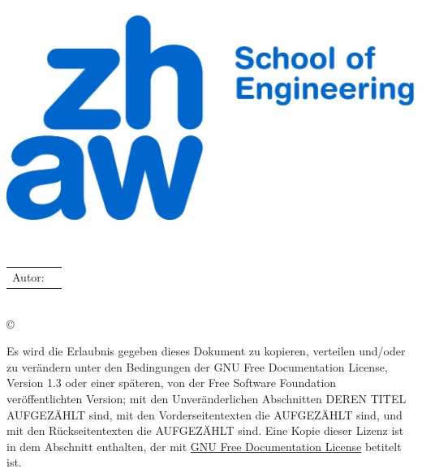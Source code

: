 \begin{titlepage}

\begin{center}
\includegraphics[scale=0.25]{pic/ZHAW_Titel}			%
\\[12ex]
\huge{\textbf{\textsc{\titel}}}							%
\\[1.5ex]
\LARGE{\textbf{\untertitel}}							%
\\[6ex]
\normalsize												%

\begin{tabular}{w{3cm}p{6cm}}
\\[12ex]Autor: & \quad \autorFirst						%
\end{tabular}
\\[24ex]
\copyright\ \jahr\\
\end{center}

\singlespacing											%
\small													%
\noindent												%


Es wird die Erlaubnis gegeben dieses Dokument zu kopieren, verteilen und/oder zu verändern
unter den Bedingungen der GNU Free Documentation License, Version 1.3 oder einer späteren, von
der Free Software Foundation veröffentlichten Version; mit den Unveränderlichen Abschnitten
DEREN TITEL	AUFGEZÄHLT sind, mit den Vorderseitentexten die AUFGEZÄHLT sind, und mit den
Rückseitentexten die AUFGEZÄHLT sind. Eine Kopie dieser Lizenz ist in	dem Abschnitt enthalten,
der mit \href{http://www.gnu.org/copyleft/fdl.html}{GNU Free Documentation License} betitelt ist.


\end{titlepage}
